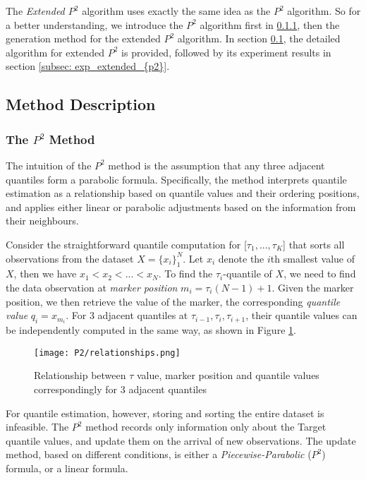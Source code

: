 The \textit{Extended $P^2$} algorithm\cite{raatikainenSequentialProcedureSimultaneous1993} uses exactly the same idea as the $P^2$ algorithm\cite{jainP2AlgorithmDynamic1985}. So for a better understanding, we introduce the $P^2$ algorithm first in \ref{subsubsec: description_{p2}}, then the generation method for the extended $P^2$ algorithm.
In section \ref{subsec: algo_extended_{p2}}, the detailed algorithm for extended $P^2$ is provided, followed by its experiment results in section \ref{subsec: exp_extended_{p2}}.

\subsection{Method Description}
\label{subsec: algo_extended_{p2}}
\subsubsection{The $P^2$ Method}
\label{subsubsec: description_{p2}}

The intuition of the $P^2$ method is the assumption that any three adjacent quantiles form a parabolic formula.
Specifically, the method interprets quantile estimation as a relationship based on quantile values and their ordering positions, and applies either linear or parabolic adjustments based on the information from their neighbours.

Consider the straightforward quantile computation for [$\tau_1, ..., \tau_K$] that sorts all observations from the dataset $X = \{x_i\}^N_1$. Let $x_i$ denote the $i$th smallest value of $X$, then we have $x_1 < x_2 < ... < x_N$. 
To find the $\tau_i$-quantile of $X$, we need to find the data observation at \textit{marker position} $m_i = \tau_i (N-1) + 1$. Given the marker position, we then retrieve the value of the marker, the corresponding \textit{quantile value} $q_i = x_{m_i}$. 
For 3 adjacent quantiles at $\tau_{i-1}, \tau_i, \tau_{i+1}$, their quantile values can be independently computed in the same way, as shown in Figure \ref{fig: {multi_relationship_p2}}.

\begin{figure}[h]
    \centering
	\texttt{[image: P2/relationships.png]}
    \caption{Relationship between $\tau$ value, marker position and quantile values correspondingly for 3 adjacent quantiles}
    \label{fig: {multi_relationship_p2}}
\end{figure}

For quantile estimation, however, storing and sorting the entire dataset is infeasible. The $P^2$ method records only information only about the Target quantile values, and update them on the arrival of new observations. The update method, based on different conditions, is either a \textit{Piecewise-Parabolic} ($P^2$) formula, or a linear formula.

